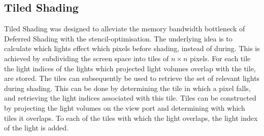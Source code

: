 

\subsection{Tiled Shading}

Tiled Shading\cite{olsson2011tiled} was designed to alleviate the memory
bandwidth bottleneck of Deferred Shading with the stencil-optimisation. The
underlying idea is to calculate which lights effect which pixels before shading,
instead of during. This is achieved by subdividing the screen space into tiles
of $n \times n$ pixels. For each tile the light indices of the lights which
projected light volumes overlap with the tile, are stored. The tiles can
subsequently be used to retrieve the set of relevant lights during shading.
This can be done by determining the tile in which a pixel falls, and retrieving
the light indices associated with this tile.
Tiles can be constructed by projecting the light volumes on the view port and
determining with which tiles it overlaps. To each of the tiles with which the light
overlaps, the light index of the light is added.

